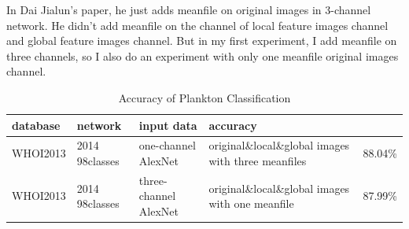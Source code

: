 \documentclass{article}
\begin{document}
\begin{figure}[!ht] 
  \centering 
  \hspace{0.3in} 
   \hspace{0.3in} 
\end{figure}

In Dai Jialun's paper, he just adds meanfile on original images in 3-channel network. He didn't add meanfile on the channel of local feature images channel and global feature images channel. But in my first experiment, I add meanfile on three channels, so I also do an experiment with only one meanfile original images channel. 

\begin{table}[!ht]
  \caption{Accuracy of Plankton Classification}
  \centering
  \begin{tabular}{lllll}
    \toprule
    \cmidrule{1-5}
  	database &network  &input data   &accuracy  \\
    \midrule
    WHOI2013&2014 98classes  &one-channel  AlexNet &original\&local\&global images with three meanfiles   & 88.04\% \\ \hline
    WHOI2013&2014 98classes   &three-channel  AlexNet &original\&local\&global images  with one meanfile  &87.99\% \\
    \bottomrule
  \end{tabular}
\end{table}
\end{document}
